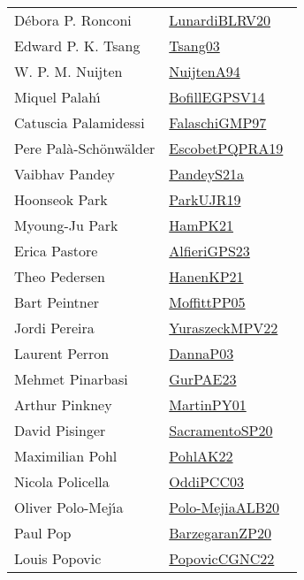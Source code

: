 {\begin{longtable}{p{4cm}p{20cm}}
D{\'{e}}bora P. Ronconi & \href{works/LunardiBLRV20.pdf}{LunardiBLRV20}~\cite{LunardiBLRV20}\\
Edward P. K. Tsang & \href{works/Tsang03.pdf}{Tsang03}~\cite{Tsang03}\\
W. P. M. Nuijten & \href{}{NuijtenA94}~\cite{NuijtenA94}\\
Miquel Palah{\'{\i}} & \href{works/BofillEGPSV14.pdf}{BofillEGPSV14}~\cite{BofillEGPSV14}\\
Catuscia Palamidessi & \href{works/FalaschiGMP97.pdf}{FalaschiGMP97}~\cite{FalaschiGMP97}\\
Pere Pal{\`{a}}{-}Sch{\"{o}}nw{\"{a}}lder & \href{works/EscobetPQPRA19.pdf}{EscobetPQPRA19}~\cite{EscobetPQPRA19}\\
Vaibhav Pandey & \href{works/PandeyS21a.pdf}{PandeyS21a}~\cite{PandeyS21a}\\
Hoonseok Park & \href{works/ParkUJR19.pdf}{ParkUJR19}~\cite{ParkUJR19}\\
Myoung-Ju Park & \href{works/HamPK21.pdf}{HamPK21}~\cite{HamPK21}\\
Erica Pastore & \href{works/AlfieriGPS23.pdf}{AlfieriGPS23}~\cite{AlfieriGPS23}\\
Theo Pedersen & \href{works/HanenKP21.pdf}{HanenKP21}~\cite{HanenKP21}\\
Bart Peintner & \href{works/MoffittPP05.pdf}{MoffittPP05}~\cite{MoffittPP05}\\
Jordi Pereira & \href{works/YuraszeckMPV22.pdf}{YuraszeckMPV22}~\cite{YuraszeckMPV22}\\
Laurent Perron & \href{works/DannaP03.pdf}{DannaP03}~\cite{DannaP03}\\
Mehmet Pinarbasi & \href{works/GurPAE23.pdf}{GurPAE23}~\cite{GurPAE23}\\
Arthur Pinkney & \href{works/MartinPY01.pdf}{MartinPY01}~\cite{MartinPY01}\\
David Pisinger & \href{works/SacramentoSP20.pdf}{SacramentoSP20}~\cite{SacramentoSP20}\\
Maximilian Pohl & \href{works/PohlAK22.pdf}{PohlAK22}~\cite{PohlAK22}\\
Nicola Policella & \href{works/OddiPCC03.pdf}{OddiPCC03}~\cite{OddiPCC03}\\
Oliver Polo{-}Mej{\'{\i}}a & \href{}{Polo-MejiaALB20}~\cite{Polo-MejiaALB20}\\
Paul Pop & \href{works/BarzegaranZP20.pdf}{BarzegaranZP20}~\cite{BarzegaranZP20}\\
Louis Popovic & \href{works/PopovicCGNC22.pdf}{PopovicCGNC22}~\cite{PopovicCGNC22}\\

\end{longtable}}
